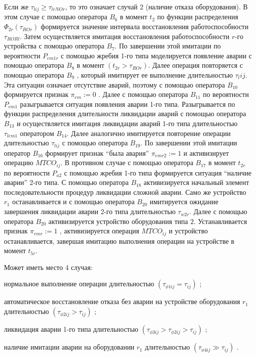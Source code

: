 Если же $\tau_{lij} \geq \tau_{lrNOr} $, то это означает случай 2 (наличие отказа оборудования). В этом случае с помощью оператора $B_6$ в момент $t_2$ по функции распределения $\Phi_{2r}(\tau_{ROr})$ формируется значение интервала восстановления работоспособности $\tau_{RORl}$. Затем осуществляется имитация восстановления работоспособности $r$-го устройства с помощью оператора $B_7$.  По завершении этой имитации по вероятности $P_{em1r}$ с помощью жребия 1-го типа моделируется появление аварии с помощью оператора $B_8$ в момент $( t_{2r} > \tau_{ROr} )$.  Далее операция повторяется с помощью оператора $B_{9}$ , который имитирует ее выполнение длительностью  $\tau_lij$. Эта ситуации означает отсутствие аварий, поэтому с помощью оператора $B_{10}$ формируется признак $\pi_{em}:=0$ . Далее с помощью оператора $B_11$ по вероятности $P_{em1}$ разыгрывается ситуация появления аварии 1-го типа. Разыгрывается по функции распределения длительности ликвидации аварий с помощью оператора $B_{13}$ и осуществляется имитация ликвидации аварий 1-го типа  длительностью $\tau_{lem1}$ оператором $B_14$. Далее аналогично имитируется повторение операции длительностью $\tau_{lij}$ с помощью оператора  $B_{19}$.  По завершении этой имитации оператор $B_{16}$ формирует признак ``была авария'' $\pi_{emr2}:=1$ и активизирует операцию  $MTCO_{ij}$. В противном случае с помощью оператора  $B_{17}$ в момент $t_{2r}$ по вероятности  $P_{a2}$ с помощью жребия 1-го типа формируется ситуация ``наличие аварии'' 2-го типа. С помощью оператора $B_18$ активизируется начальный элемент последовательности процедур ликвидации сложной аварии. Само же устройство $r_1$ останавливается и с помощью оператора $B_20$ имитируется ожидание завершения ликвидации аварии 2-го типа длительностью $\tau_{w2r}$.  Далее с помощью оператора $B_{20}$ активизируется устройство оборудования типа $2$. Устанавливается признак $\pi_{emr}:=1$  , активизируется операция $MTCO_{ij}$ и устройство останавливается, завершая имитацию  выполнения операции на устройстве в момент $t_{5r}$.

Может иметь место 4 случая:
\begin{textitemize}
    \item нормальное выполнение операции длительностью $( \tau_{ \phi 1 ij} = \tau_{ij} )$ ;

    \item автоматическое восстановление отказа без аварии на устройстве оборудования $r_1$ длительностью $( \tau_{\phi 2 ij} > \tau_{ij} )$ ;

    \item ликвидация аварии 1-го типа длительностью $( \tau_{\phi 3 ij} > \tau_{\phi 2 ij} > \tau_{ij} )$  ;

    \item наличие имитации аварии на оборудовании $r_1$ длительностью $( \tau_{ \phi 4 ij} \gg  \tau_{ij} )$ .

\end{textitemize}

